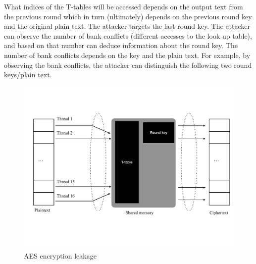 What indices of the T-tables will be accessed depends on the output text from the previous round which in turn (ultimately) depends on the previous round key and the original plain text. 
% 
%
%
%
The attacker targets the last-round key. 
%
The attacker can observe the number of bank conflicts (different accesses to the look up table), and based on that number can deduce information about the round key.
%
The number of bank conflicts depends on the key and the plain text. 
%
For example, by observing the bank conflicts, the attacker can distinguish the following two round keys/plain text.


\begin{figure}[h]
    \centering
    \includegraphics[clip,trim=0 4cm 0 0cm,width=0.7\pdfpagewidth]{figs/AES1.pdf}
    \caption{AES encryption leakage }
\end{figure}

